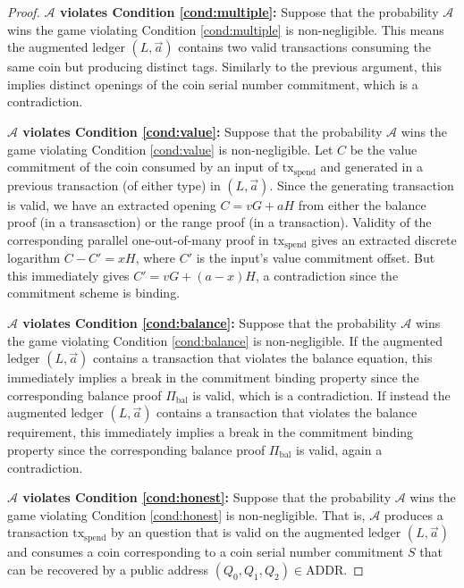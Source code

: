 \documentclass{llncs}
\begin{document}
\begin{proof}
\textbf{$\mathcal{A}$ violates Condition \ref{cond:multiple}:} Suppose that the probability $\mathcal{A}$ wins the game violating Condition \ref{cond:multiple} is non-negligible.
This means the augmented ledger $(L, \vec{a})$ contains two valid  transactions consuming the same coin but producing distinct tags.
Similarly to the previous argument, this implies distinct openings of the coin serial number commitment, which is a contradiction.

\textbf{$\mathcal{A}$ violates Condition \ref{cond:value}:} Suppose that the probability $\mathcal{A}$ wins the game violating Condition \ref{cond:value} is non-negligible.
Let $C$ be the value commitment of the coin consumed by an input of $\text{tx}_{\text{spend}}$ and generated in a previous transaction (of either type) in $(L, \vec{a})$.
Since the generating transaction is valid, we have an extracted opening $C = vG + aH$ from either the balance proof (in a  transasction) or the range proof (in a  transaction).
Validity of the corresponding parallel one-out-of-many proof in $\text{tx}_{\text{spend}}$ gives an extracted discrete logarithm $C - C' = xH$, where $C'$ is the input's value commitment offset.
But this immediately gives $C' = vG + (a - x)H$, a contradiction since the commitment scheme is binding.

\textbf{$\mathcal{A}$ violates Condition \ref{cond:balance}:} Suppose that the probability $\mathcal{A}$ wins the game violating Condition \ref{cond:balance} is non-negligible.
If the augmented ledger $(L, \vec{a})$ contains a  transaction that violates the balance equation, this immediately implies a break in the commitment binding property since the corresponding balance proof $\Pi_{\text{bal}}$ is valid, which is a contradiction.
If instead the augmented ledger $(L, \vec{a})$ contains a  transaction that violates the balance requirement, this immediately implies a break in the commitment binding property since the corresponding balance proof $\Pi_{\text{bal}}$ is valid, again a contradiction.

\textbf{$\mathcal{A}$ violates Condition \ref{cond:honest}:} Suppose that the probability $\mathcal{A}$ wins the game violating Condition \ref{cond:honest} is non-negligible.
That is, $\mathcal{A}$ produces a  transaction $\text{tx}_{\text{spend}}$ by an  question that is valid on the augmented ledger $(L, \vec{a})$ and consumes a coin corresponding to a coin serial number commitment $S$ that can be recovered by a public address $(Q_0, Q_1, Q_2) \in \text{ADDR}$.


\end{proof}
\end{document}
